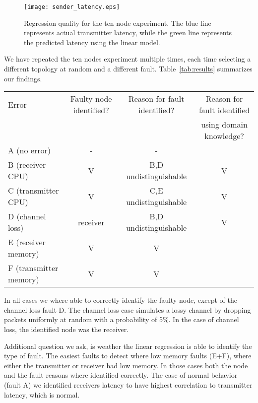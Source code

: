 \documentclass[times, 10pt,twocolumn]{article}
\begin{document}
\begin{figure}[ht!]
\hspace{-0.8cm}
\texttt{[image: sender\_latency.eps]}\\
  \caption{Regression quality for the ten node experiment. The blue line represents actual transmitter latency, while the green line represents the predicted latency using the linear model.}\label{fig:sender_latency}
\end{figure}











We have repeated the ten nodes experiment multiple times, each time selecting a different topology at random
and a different fault. Table~\ref{tab:results} summarizes our findings.
\begin{table*}[ht!]
  \centering
\begin{tabular}{|l|c|c|c|}
  \hline
  Error & Faulty node identified? & Reason for fault identified? & Reason for fault identified\\
  & & & using domain knowledge? \\ \hline
A (no error) & - & - &\\
  B (receiver CPU) & V & B,D undistinguishable & V\\
  C (transmitter CPU) & V & C,E undistinguishable & V\\
  D (channel loss) & receiver &  B,D undistinguishable & V\\
  E (receiver memory) & V & V & \\
  F (transmitter memory) & V & V & \\
   \hline
\end{tabular}
  \caption{Summary of results for the randomly constructed ten nodes overlays.}\label{tab:results}
\end{table*}
In all cases we where able to correctly identify the faulty node, except of the channel loss fault D.
The channel loss case simulates a lossy channel by dropping packets uniformly at random with
a probability of 5\%. In the case of channel loss, the identified node was the receiver.

Additional question we ask, is weather the linear regression is able to identify the type of fault.
The easiest faults to detect where low memory faults (E+F), where either the transmitter or receiver had low memory. In those cases both the node and the fault reasons where identified correctly. The case of normal behavior (fault A) we identified receivers latency to have highest correlation to transmitter latency, which is normal.
\end{document}
